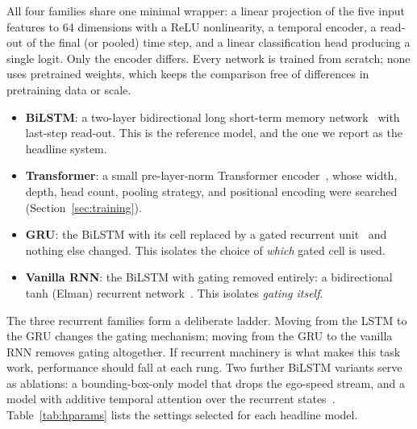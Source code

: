 \documentclass[mti,article,submit,moreauthors]{Definitions/mdpi}
\begin{document}
All four families share one minimal wrapper: a linear projection of the five input features to 64 dimensions with a ReLU nonlinearity, a temporal encoder, a read-out of the final (or pooled) time step, and a linear classification head producing a single logit. Only the encoder differs. Every network is trained from scratch; none uses pretrained weights, which keeps the comparison free of differences in pretraining data or scale.

\begin{itemize}
\item \textbf{BiLSTM}: a two-layer bidirectional long short-term memory network~\citep{hochreiter1997lstm,schuster1997bilstm} with last-step read-out. This is the reference model, and the one we report as the headline system.
\item \textbf{Transformer}: a small pre-layer-norm Transformer encoder~\citep{vaswani2017attention,xiong2020prelayernorm}, whose width, depth, head count, pooling strategy, and positional encoding were searched (Section~\ref{sec:training}).
\item \textbf{GRU}: the BiLSTM with its cell replaced by a gated recurrent unit~\citep{cho2014gru,chung2014gru} and nothing else changed. This isolates the choice of \emph{which} gated cell is used.
\item \textbf{Vanilla RNN}: the BiLSTM with gating removed entirely: a bidirectional tanh (Elman) recurrent network~\citep{elman1990rnn,rumelhart1986backprop}. This isolates \emph{gating itself}.
\end{itemize}

The three recurrent families form a deliberate ladder. Moving from the LSTM to the GRU changes the gating mechanism; moving from the GRU to the vanilla RNN removes gating altogether. If recurrent machinery is what makes this task work, performance should fall at each rung. Two further BiLSTM variants serve as ablations: a bounding-box-only model that drops the ego-speed stream, and a model with additive temporal attention over the recurrent states~\citep{bahdanau2015attention}. Table~\ref{tab:hparams} lists the settings selected for each headline model.
\end{document}
